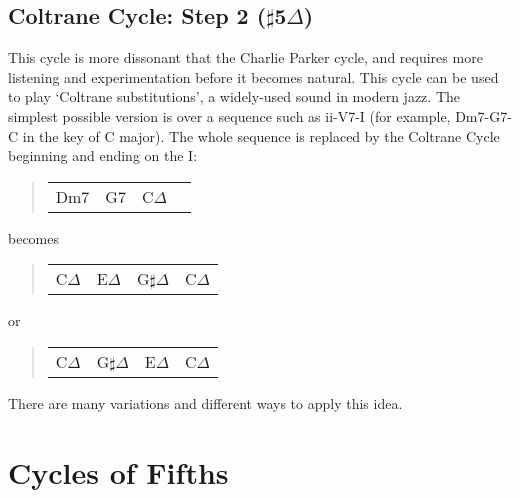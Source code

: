 \documentclass[english]{./gbook}
\begin{document}
\begin{large}
\subsection*{Coltrane Cycle: Step 2 ($\sharp$5$\Delta$)}
This cycle is more dissonant that the Charlie Parker cycle, and requires more listening and experimentation before it becomes natural. This cycle can be used to play `Coltrane substitutions', a widely-used sound in modern jazz. The simplest possible version is over a sequence such as ii-V7-I (for example, Dm7-G7-C in the key of C major). The whole sequence is replaced by the Coltrane Cycle beginning and ending on the I:
\begin{quote}
\begin{tabular}{|p{3cm}|p{3cm}|p{3cm}|p{3cm}|}
	Dm7 &  G7 & C$\Delta$  & 
\end{tabular}
\end{quote}
becomes
\begin{quote}
\begin{tabular}{|p{3cm}|p{3cm}|p{3cm}|p{3cm}|}
	C$\Delta$ &  E$\Delta$ & G$\sharp$$\Delta$  & C$\Delta$
\end{tabular}
\end{quote}
or
\begin{quote}
\begin{tabular}{|p{3cm}|p{3cm}|p{3cm}|p{3cm}|}
	C$\Delta$ &  G$\sharp$$\Delta$ & E$\Delta$  & C$\Delta$
\end{tabular}
\end{quote}
There are many variations and different ways to apply this idea.


\section{Cycles of Fifths}


\end{large}
\end{document}
